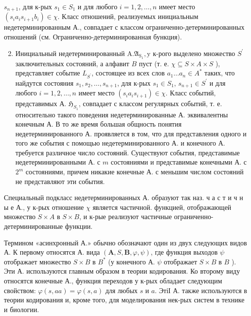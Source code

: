 \documentclass[10pt]{article}
\begin{document}
$s_{n+1}$, для к-рых $s_{1} \in S_{1}$ и для любого $i=1,2, \ldots, n$ имеет место $\left(s_{i} a_{i} s_{i+1} b_{i}\right) \in \chi$. Класс отношений, реализуемых инициальным недетерминированным А., совпадает с классом ограниченно-детерминированных отношений (см. Ограниченно-детерминированная бункция).



\begin{enumerate}

  \setcounter{enumi}{1}

  \item Инициальный недетерминированный $\mathrm{A} . \mathfrak{\mathfrak { A }}_{\mathrm{S}_{1}}, \mathrm{y}$ к-рого выделено множество $S^{\prime}$ заключительных состояний, а алфавит $B$ пуст (т. е. $\chi \subseteq S \times A \times S$ ), представляет событие $L_{S^{\prime}}$, состоящее из всех слов $a_{1} \ldots a_{n} \in A^{*}$ таких, что найдутся состояния $s_{1}, s_{2}, \ldots, s_{n+1}$, для к-рых $s_{1} \in S_{1}$, $s_{n+1} \in S^{\prime}$ и для любого $i=1,2, \ldots, n$ имеет место $\left(s_{i} a_{i} s_{i+1}\right) \in \chi$. Класс событий, представимых А. $\mathfrak{H}_{S_{1}}$, совпадает с классом регулярных событий, т. е. относительно такого поведения недетерминированные А. эквивалентны конечным А. В то же время большая общность понятия недетерминированного А. проявляется в том, что для представления одного и того же события с помощью недетерминированного А. и конечного А. требуется различное число состояний. Существуют события, представимые недетерминированными А. с $m$ состояниями и представимые конечными А. с $2^{m}$ состояниями, причем никакие конечные А. с меньшим числом состояний не представляют эти события.

\end{enumerate}



Специальный подкласс недетерминированных А. образуют так наз. ч а с т и ч н ы е А., у к-рых отношение $\chi$ является частичной. функцией, отображающей множество $S \times A$ в $S \times B$, и к-рые реализуют частичные ограниченно-детерминированные функции.



Термином «асинхронный А.» обычно обозначают один из двух следующих видов А. К первому относятся А. вида $(\boldsymbol{A}, S, \boldsymbol{B}, \varphi, \psi)$, где функция выходов $\psi$ отображает множество $S \times B$ в $B^{*}$ (у конечного А. $\psi$ отображает $S \times B$ в $B$ ). Эти А. используются главным образом в теории кодирования. Ко второму виду относятся конечные А., функция переходов у к-рых обладает следующим свойством: $\varphi(s, a a)=\varphi(s, a)$ для любых $s$ и $a$. ЭтіІ А. также используются в теории кодирования и, кроме того, для моделирования нек-рых систем в технике и биологии.
\end{document}
